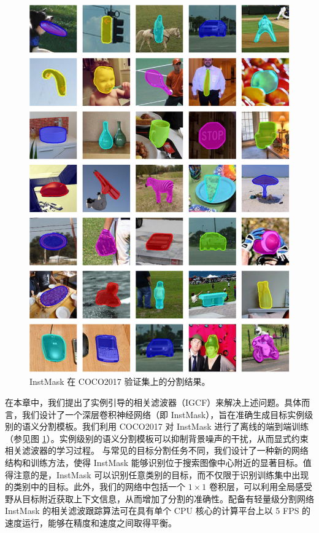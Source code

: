\begin{figure}
\centering
\includegraphics[width=1.0\textwidth]{Img/IGCF/coco.pdf}
\caption{InstMask 在 COCO2017 \cite{COCO} 验证集上的分割结果。}
\label{fig:IGCF_vis_coco}
\end{figure}

在本章中，我们提出了实例引导的相关滤波器（IGCF）来解决上述问题。具体而言，我们设计了一个深层卷积神经网络（即 InstMask），旨在准确生成目标实例级别的语义分割模板。我们利用 COCO2017 \cite{COCO} 对 InstMask 进行了离线的端到端训练（参见图 \ref{fig:IGCF_vis_coco}）。实例级别的语义分割模板可以抑制背景噪声的干扰，从而显式约束相关滤波器的学习过程。
与常见的目标分割任务不同，我们设计了一种新的网络结构和训练方法，使得 InstMask 能够识别位于搜索图像中心附近的显著目标。值得注意的是，InstMask 可以识别任意类别的目标，而不仅限于识别训练集中出现的类别中的目标。此外，我们的网络中包括一个 $1 \times 1$ 卷积层，可以利用全局感受野从目标附近获取上下文信息，从而增加了分割的准确性。配备有轻量级分割网络 InstMask 的相关滤波跟踪算法可在具有单个 CPU 核心的计算平台上以 5 FPS 的速度运行，能够在精度和速度之间取得平衡。

